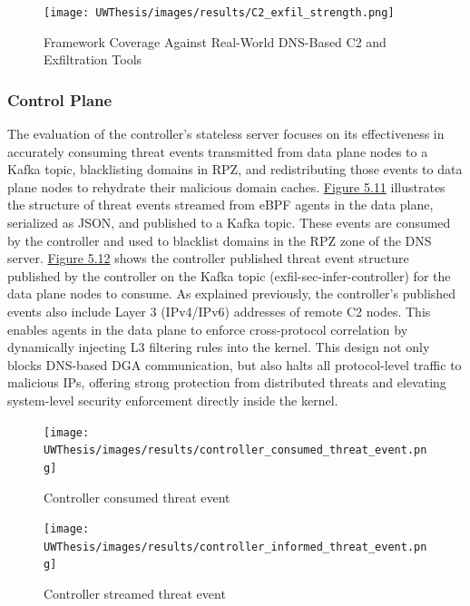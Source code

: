 \documentclass [11pt, proquest] {uwthesis}[2020/02/24]
\begin{document}
\newpage
\begin{figure}[H]
  \texttt{[image: UWThesis/images/results/C2\_exfil\_strength.png]}
  \caption{Framework Coverage Against Real-World DNS-Based C2 and Exfiltration Tools}
\label{tab:dns-framework-coverage}
\end{figure}

\subsubsection{Control Plane}
The evaluation of the controller’s stateless server focuses on its effectiveness in accurately consuming threat events transmitted from data plane nodes to a Kafka topic, blacklisting domains in RPZ, and redistributing those events to data plane nodes to rehydrate their malicious domain caches. \hyperref[fig:controller_metric]{Figure 5.11} illustrates the structure of threat events streamed from eBPF agents in the data plane, serialized as JSON, and published to a Kafka topic. These events are consumed by the controller and used to blacklist domains in the RPZ zone of the DNS server. \hyperref[fig:controller_aware_metric]{Figure 5.12} shows the controller published threat event structure published by the controller on the Kafka topic (exfil-sec-infer-controller) for the data plane nodes to consume. As explained previously, the controller’s published events also include Layer 3 (IPv4/IPv6) addresses of remote C2 nodes. This enables agents in the data plane to enforce cross-protocol correlation by dynamically injecting L3 filtering rules into the kernel. This design not only blocks DNS-based DGA communication, but also halts all protocol-level traffic to malicious IPs, offering strong protection from distributed threats and elevating system-level security enforcement directly inside the kernel.


\begin{figure}[H]
  \centering
  \begin{minipage}[t]{0.47\textwidth}
    \centering
    \texttt{[image: UWThesis/images/results/controller\_consumed\_threat\_event.png]}
\caption{Controller consumed threat event}
  \label{fig:controller_metric}
  \end{minipage}
  \hfill
  \begin{minipage}[t]{0.47\textwidth}
    \centering
    \texttt{[image: UWThesis/images/results/controller\_informed\_threat\_event.png]}
    \caption{Controller streamed threat event}
     \label{fig:controller_aware_metric}
  \end{minipage}
\end{figure}
\end{document}
